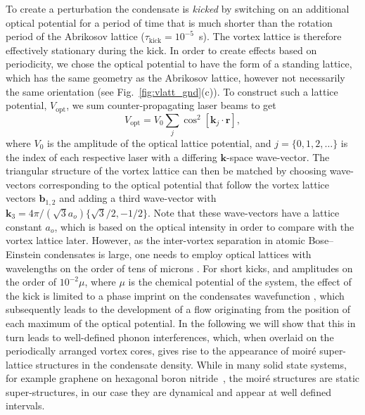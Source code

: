 
To create a perturbation the condensate is {\it kicked} by switching on an additional optical potential for a period of time that is much shorter than the rotation period of the Abrikosov lattice ($\tau_{\text{kick}}=10^{-5}$~s). The vortex lattice is therefore effectively stationary during the kick. In order to create effects based on periodicity, we chose the optical potential to have the form of a standing lattice, which has the same geometry as the Abrikosov lattice, however not necessarily the same orientation (see Fig.~\ref{fig:vlatt_gnd}(c)). To construct such a lattice potential, $V_{\text{opt}}$, we sum counter-propagating laser beams to get
	\begin{equation}
		V_{\text{opt}} = V_0\displaystyle\sum_{j}\cos^2 \left[ \textbf{k}_{j}\cdot\textbf{r} \right],
	\end{equation}
	where $V_0$ is the amplitude of the optical lattice potential, and $j=\lbrace 0,1,2,\ldots \rbrace$ is the index of each respective laser with a differing $\mathbf{k}$-space wave-vector. The triangular structure of the vortex lattice can then be matched by choosing wave-vectors corresponding to the optical potential that follow the vortex lattice vectors $\mathbf{b}_{1,2}$ and adding a third wave-vector with $\mathbf{k}_3 = 4\pi/(\sqrt{3}a_o)\{\sqrt{3}/2,-1/2\}$. Note that these wave-vectors have a lattice constant $a_o$, which is based on the optical intensity in order to compare with the vortex lattice later.
 However, as the inter-vortex separation in atomic Bose--Einstein condensates is large, one needs to employ optical lattices with wavelengths on the order of tens of microns \cite{BEC:Fallani_optexp_2005,BEC:Williams_optexp_2008}.
For short kicks, and amplitudes on the order of $10^{-2} \mu $, where $\mu$ is the chemical potential of the system, the effect of the kick is limited to a phase imprint on the condensates wavefunction \cite{Vtx:Dobrek_pra_1999}, which subsequently leads to the development of a flow originating from the position of each maximum of the optical potential. In the following we will show that this in turn leads to well-defined phonon interferences, which, when overlaid on the periodically arranged vortex cores,  gives rise to the appearance of moir\'e super-lattice structures \cite{mor:murata_acsn_2010} in the condensate density. While in many solid state systems, for example graphene on hexagonal boron nitride~\cite{nphys2272}, the moir\'e structures are static super-structures, in our case they are dynamical and appear at well defined intervals.


